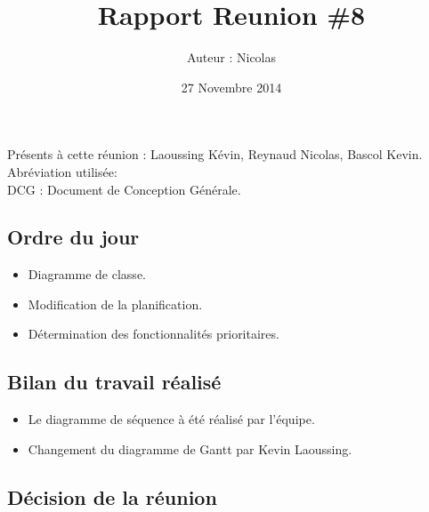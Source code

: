 \documentclass[12pt,a4paper]{article}
\title{Rapport Reunion \#8}
\author{Auteur : Nicolas \bsc{REYNAUD}}
\date{27 Novembre 2014}
\begin{document}
\maketitle

\newpage

Présents à cette réunion : Laoussing Kévin, Reynaud Nicolas, Bascol Kevin.\\

Abréviation utilisée:\\
DCG : Document de Conception Générale.

\subsection*{Ordre du jour}
\begin{itemize}[label = $\ast$]
\item Diagramme de classe.
\item Modification de la planification.
\item Détermination des fonctionnalités prioritaires.
\end{itemize}

\subsection*{Bilan du travail réalisé}

\begin{itemize}[label = $\ast$]
	\item Le diagramme de séquence à été réalisé par l'équipe.
	\item Changement du diagramme de Gantt par Kevin Laoussing.
\end{itemize}


\subsection*{Décision de la réunion}
\end{document}
